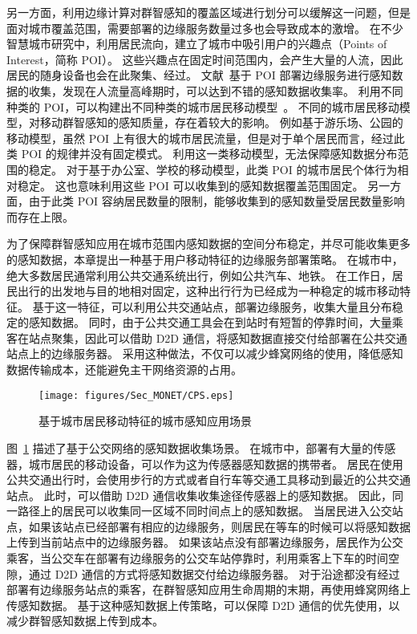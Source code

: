 另一方面，利用边缘计算对群智感知的覆盖区域进行划分可以缓解这一问题，但是面对城市覆盖范围，需要部署的边缘服务数量过多也会导致成本的激增。
在不少智慧城市研究中，利用居民流向，建立了城市中吸引用户的兴趣点（Points of Interest，简称 POI）。
这些兴趣点在固定时间范围内，会产生大量的人流，因此居民的随身设备也会在此聚集、经过。
文献~基于 POI 部署边缘服务进行感知数据的收集，发现在人流量高峰期时，可以达到不错的感知数据收集率。
利用不同种类的 POI，可以构建出不同种类的城市居民移动模型~\cite{CNKI:XiongOMCS}。
不同的城市居民移动模型，对移动群智感知的感知质量，存在着较大的影响。
例如基于游乐场、公园的移动模型，虽然 POI 上有很大的城市居民流量，但是对于单个居民而言，经过此类 POI 的规律并没有固定模式。
利用这一类移动模型，无法保障感知数据分布范围的稳定。
对于基于办公室、学校的移动模型，此类 POI 的城市居民个体行为相对稳定。
这也意味利用这些 POI 可以收集到的感知数据覆盖范围固定。
另一方面，由于此类 POI 容纳居民数量的限制，能够收集到的感知数量受居民数量影响而存在上限。

为了保障群智感知应用在城市范围内感知数据的空间分布稳定，并尽可能收集更多的感知数据，本章提出一种基于用户移动特征的边缘服务部署策略。
在城市中，绝大多数居民通常利用公共交通系统出行，例如公共汽车、地铁。
在工作日，居民出行的出发地与目的地相对固定，这种出行行为已经成为一种稳定的城市移动特征。
基于这一特征，可以利用公共交通站点，部署边缘服务，收集大量且分布稳定的感知数据。
同时，由于公共交通工具会在到站时有短暂的停靠时间，大量乘客在站点聚集，因此可以借助 D2D 通信，将感知数据直接交付给部署在公共交通站点上的边缘服务器。
采用这种做法，不仅可以减少蜂窝网络的使用，降低感知数据传输成本，还能避免主干网络资源的占用。

\begin{figure}[!h]
\centering
\vspace{-1em}
\texttt{[image: figures/Sec\_MONET/CPS.eps]}
\vspace{-0.5em}
\caption{基于城市居民移动特征的城市感知应用场景}
\vspace{-1.5em}
\label{Figure_edge}
\end{figure}

图~\ref{Figure_edge} 描述了基于公交网络的感知数据收集场景。
在城市中，部署有大量的传感器，城市居民的移动设备，可以作为这为传感器感知数据的携带者。
居民在使用公共交通出行时，会使用步行的方式或者自行车等交通工具移动到最近的公共交通站点。
此时，可以借助 D2D 通信收集收集途径传感器上的感知数据。
因此，同一路径上的居民可以收集同一区域不同时间点上的感知数据。
当居民进入公交站点，如果该站点已经部署有相应的边缘服务，则居民在等车的时候可以将感知数据上传到当前站点中的边缘服务器。
如果该站点没有部署边缘服务，居民作为公交乘客，当公交车在部署有边缘服务的公交车站停靠时，利用乘客上下车的时间空隙，通过 D2D 通信的方式将感知数据交付给边缘服务器。
对于沿途都没有经过部署有边缘服务站点的乘客，在群智感知应用生命周期的末期，再使用蜂窝网络上传感知数据。
基于这种感知数据上传策略，可以保障 D2D 通信的优先使用，以减少群智感知数据上传到成本。

